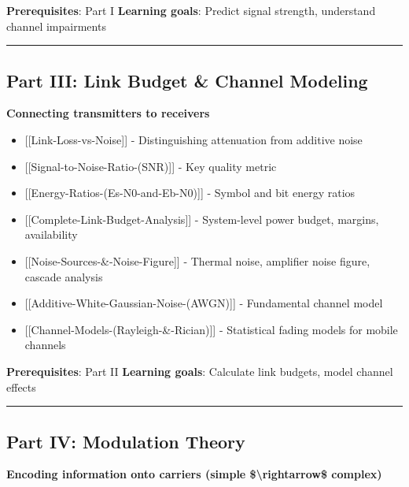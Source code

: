\textbf{Prerequisites}: Part I \textbf{Learning goals}: Predict signal
strength, understand channel impairments

\begin{center}\rule{0.5\linewidth}{0.5pt}\end{center}

\subsection{\texorpdfstring{ Part III: Link Budget \& Channel
Modeling}{ Part III: Link Budget \& Channel Modeling}}\label{part-iii-link-budget-channel-modeling}

\textbf{Connecting transmitters to receivers}

\begin{itemize}
\tightlist
\item
  {[}{[}Link-Loss-vs-Noise{]}{]} - Distinguishing attenuation from
  additive noise
\item
  {[}{[}Signal-to-Noise-Ratio-(SNR){]}{]} - Key quality metric
\item
  {[}{[}Energy-Ratios-(Es-N0-and-Eb-N0){]}{]} - Symbol and bit energy
  ratios
\item
  {[}{[}Complete-Link-Budget-Analysis{]}{]} - System-level power budget,
  margins, availability
\item
  {[}{[}Noise-Sources-\&-Noise-Figure{]}{]} - Thermal noise, amplifier
  noise figure, cascade analysis
\item
  {[}{[}Additive-White-Gaussian-Noise-(AWGN){]}{]} - Fundamental channel
  model
\item
  {[}{[}Channel-Models-(Rayleigh-\&-Rician){]}{]} - Statistical fading
  models for mobile channels
\end{itemize}

\textbf{Prerequisites}: Part II \textbf{Learning goals}: Calculate link
budgets, model channel effects

\begin{center}\rule{0.5\linewidth}{0.5pt}\end{center}

\subsection{\texorpdfstring{ Part IV: Modulation
Theory}{ Part IV: Modulation Theory}}\label{part-iv-modulation-theory}

\textbf{Encoding information onto carriers (simple
\$\textbackslash rightarrow\$ complex)}

